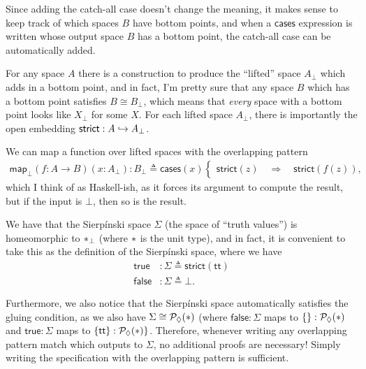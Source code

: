 Since adding the catch-all case doesn't change the meaning, it makes sense to keep track of which spaces $B$ have bottom points, and when a $\mathsf{cases}$ expression is written whose output space $B$ has a bottom point, the catch-all case can be automatically added.

For any space $A$ there is a construction to produce the ``lifted'' space $A_\bot$ which adds in a bottom point, and in fact, I'm pretty sure that any space $B$ which has a bottom point satisfies $B \cong B_\bot$, which means that \emph{every} space with a bottom point looks like $X_\bot$ for some $X$. For each lifted space $A_\bot$, there is importantly the open embedding $\mathsf{strict} : A \hookrightarrow A_\bot$.

We can map a function over lifted spaces with the overlapping pattern
\begin{align*}
\mathsf{map}_\bot(f : A \to B)(x : A_\bot) : B_\bot \triangleq
  \mathsf{cases}(x)
  \begin{cases}
  \mathsf{strict}(z) \quad \Longrightarrow \quad \mathsf{strict}(f(z)),
  \end{cases}
\end{align*}
which I think of as Haskell-ish, as it forces its argument to compute the result, but if the input is $\bot$, then so is the result.

We have that the Sierpínski space $\Sigma$ (the space of ``truth values'') is homeomorphic to $\ast_\bot$ (where $\ast$ is the unit type), and in fact, it is convenient to take this as the definition of the Sierpínski space, where we have
\begin{align*}
\mathsf{true} &: \Sigma \triangleq \mathsf{strict}(\mathsf{tt})
\\ \mathsf{false} &: \Sigma \triangleq \bot.
\end{align*}

Furthermore, we also notice that the Sierpínski space automatically satisfies the gluing condition, as we also have $\Sigma \cong \mathcal{P}_\lozenge(\ast)$ (where $\mathsf{false} : \Sigma$ maps to $\{ \} : \mathcal{P}_\lozenge(\ast)$ and $\mathsf{true} : \Sigma$ maps to $\{ \mathsf{tt} \} : \mathcal{P}_\lozenge(\ast) \}$. Therefore, whenever writing any overlapping pattern match which outputs to $\Sigma$, no additional proofs are necessary! Simply writing the specification with the overlapping pattern is sufficient.

